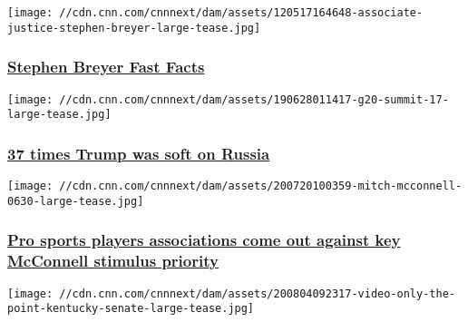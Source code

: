 \href{/2013/02/19/us/stephen-breyer-fast-facts/index.html}{}

\texttt{[image: //cdn.cnn.com/cnnnext/dam/assets/120517164648-associate-justice-stephen-breyer-large-tease.jpg]}

\hypertarget{stephen-breyer-fast-facts}{%
\subsubsection{\texorpdfstring{\href{/2013/02/19/us/stephen-breyer-fast-facts/index.html}{Stephen
Breyer Fast
Facts}}{Stephen Breyer Fast Facts}}\label{stephen-breyer-fast-facts}}

\href{/2019/11/17/politics/trump-soft-on-russia/index.html}{}

\texttt{[image: //cdn.cnn.com/cnnnext/dam/assets/190628011417-g20-summit-17-large-tease.jpg]}

\hypertarget{37-times-trump-was-soft-on-russia}{%
\subsubsection{\texorpdfstring{\href{/2019/11/17/politics/trump-soft-on-russia/index.html}{37
times Trump was soft on
Russia}}{37 times Trump was soft on Russia}}\label{37-times-trump-was-soft-on-russia}}

\href{/2020/08/03/politics/pro-sports-associations-against-gop-stimulus/index.html}{}

\texttt{[image: //cdn.cnn.com/cnnnext/dam/assets/200720100359-mitch-mcconnell-0630-large-tease.jpg]}

\hypertarget{pro-sports-players-associations-come-out-against-key-mcconnell-stimulus-priority-}{%
\subsubsection{\texorpdfstring{\href{/2020/08/03/politics/pro-sports-associations-against-gop-stimulus/index.html}{Pro
sports players associations come out against key McConnell stimulus
priority
}}{Pro sports players associations come out against key McConnell stimulus priority }}\label{pro-sports-players-associations-come-out-against-key-mcconnell-stimulus-priority-}}

\href{/videos/politics/2020/08/04/amy-mcgrath-mitch-mcconell-kentucky-senate-cillizza-the-point.cnn}{}

\texttt{[image: //cdn.cnn.com/cnnnext/dam/assets/200804092317-video-only-the-point-kentucky-senate-large-tease.jpg]}

